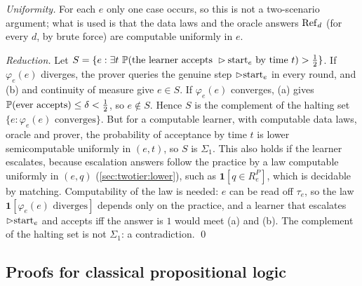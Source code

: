 \emph{Uniformity.} For each $e$ only one case occurs, so this is not a two-scenario argument; what is used is that the data laws and the oracle answers $\mathrm{Ref}_d$ (for every $d$, by brute force) are computable uniformly in $e$.

\emph{Reduction.} Let $S=\{e:\exists t\ \Prob(\text{the learner accepts }\step\mathrm{start}_e\text{ by time }t)>\frac12\}$. If $\varphi_e(e)$ diverges, the prover queries the genuine step $\rhd\mathrm{start}_e$ in every round, and (b) and continuity of measure give $e\in S$. If $\varphi_e(e)$ converges, (a) gives $\mathbb{P}(\text{ever accepts})\le\delta<\frac12$, so $e\notin S$. Hence $S$ is the complement of the halting set $\{e:\varphi_e(e)\text{ converges}\}$. But for a computable learner, with computable data laws, oracle and prover, the probability of acceptance by time $t$ is lower semicomputable uniformly in $(e,t)$, so $S$ is $\Sigma_1$. This also holds if the learner escalates, because escalation answers follow the practice by a law computable uniformly in $(e,q)$ (\cref{sec:twotier:lower}), such as $\mathbf 1[q\in R^P_e]$, which is decidable by matching. Computability of the law is needed: $e$ can be read off $\tau_e$, so the law $\mathbf 1[\varphi_e(e)\text{ diverges}]$ depends only on the practice, and a learner that escalates $\rhd\mathrm{start}_e$ and accepts iff the answer is $1$ would meet (a) and (b). The complement of the halting set is not $\Sigma_1$: a contradiction. \qed

\subsection{Proofs for classical propositional logic}\label{app:twotier:cpc}


